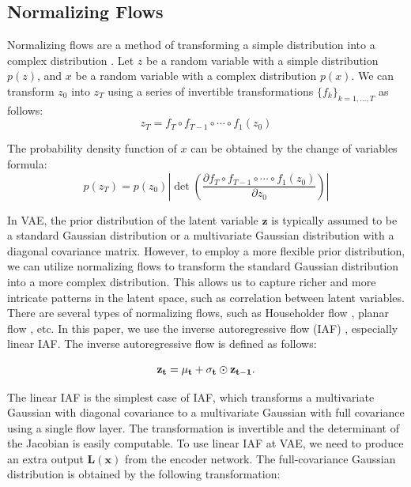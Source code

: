 \documentclass[10pt]{article}
\begin{document}
\subsection{Normalizing Flows}

Normalizing flows are a method of transforming a simple distribution into a complex distribution \cite{rezende15normalizingflows}. Let $z$ be a random variable with a simple distribution $p(z)$, and $x$ be a random variable with a complex distribution $p(x)$. We can transform $z_0$ into $z_T$ using a series of invertible transformations $\{f_k\}_{k=1,\ldots,T}$ as follows:
\begin{equation}
    z_T = f_T \circ f_{T-1} \circ \cdots \circ f_1(z_0)
\end{equation}

The probability density function of $x$ can be obtained by the change of variables formula:
\begin{equation}
    p(z_T) = p(z_0) \left| \det \left( \frac{\partial f_T \circ f_{T-1} \circ \cdots \circ f_1(z_0)}{\partial z_0} \right) \right|
\end{equation}

In VAE, the prior distribution of the latent variable $\mathbf{z}$ is typically assumed to be a standard Gaussian distribution or a multivariate Gaussian distribution with a diagonal covariance matrix. \cite{kingma2013auto} However, to employ a more flexible prior distribution, we can utilize normalizing flows to transform the standard Gaussian distribution into a more complex distribution. This allows us to capture richer and more intricate patterns in the latent space, such as correlation between latent variables.\\

There are several types of normalizing flows, such as Householder flow \cite{tomczak2017householder}, planar flow \cite{rezende15normalizingflows}, etc. In this paper, we use the inverse autoregressive flow (IAF) \cite{kingma2016iaf}, especially linear IAF. The inverse autoregressive flow is defined as follows:

\begin{equation}
    \bf z_t = \bf \mu_t + \bf \sigma_t \odot \bf z_{t-1}.
\end{equation}

The linear IAF is the simplest case of IAF, which transforms a multivariate Gaussian with diagonal covariance to a multivariate Gaussian with full covariance using a single flow layer. The transformation is invertible and the determinant of the Jacobian is easily computable. To use linear IAF at VAE, we need to produce an extra output $\mathbf{L(x)}$ from the encoder network. The full-covariance Gaussian distribution is obtained by the following transformation:
\end{document}
